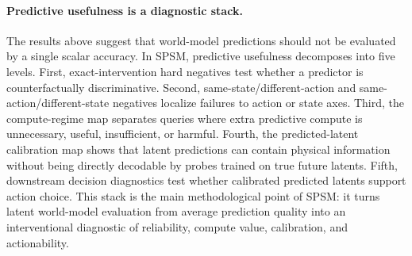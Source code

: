 \paragraph{Predictive usefulness is a diagnostic stack.}
The results above suggest that world-model predictions should not be evaluated by a single scalar accuracy. In SPSM, predictive usefulness decomposes into five levels. First, exact-intervention hard negatives test whether a predictor is counterfactually discriminative. Second, same-state/different-action and same-action/different-state negatives localize failures to action or state axes. Third, the compute-regime map separates queries where extra predictive compute is unnecessary, useful, insufficient, or harmful. Fourth, the predicted-latent calibration map shows that latent predictions can contain physical information without being directly decodable by probes trained on true future latents. Fifth, downstream decision diagnostics test whether calibrated predicted latents support action choice. This stack is the main methodological point of SPSM: it turns latent world-model evaluation from average prediction quality into an interventional diagnostic of reliability, compute value, calibration, and actionability.
